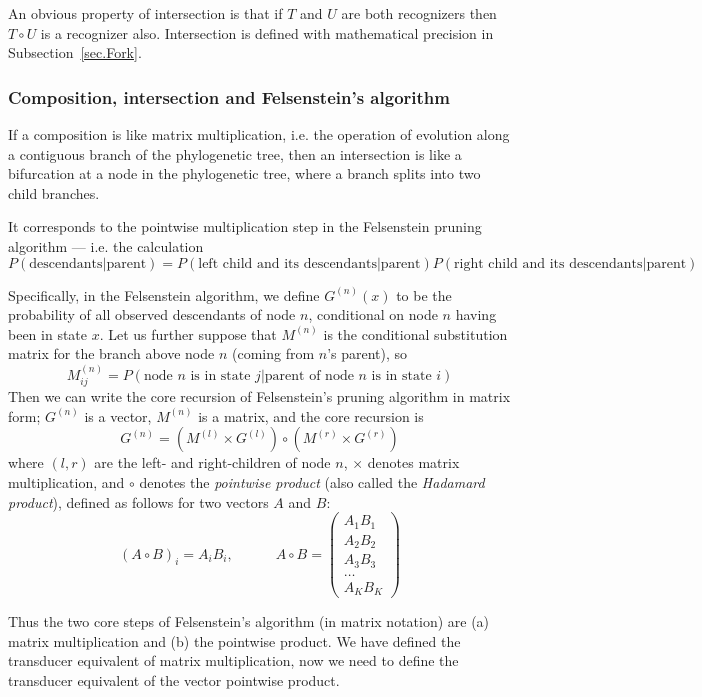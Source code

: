 \documentclass{article}
\newcommand{\secref}[1]{Subsection~\ref{sec.#1}}
\newcommand{\seclabel}[1]{\label{sec.#1}}
\newcommand\fork{\circ}
\begin{document}
An obvious property of intersection is that
if $T$ and $U$ are both recognizers then $T \fork U$ is a recognizer also.
Intersection is defined with mathematical precision in \secref{Fork}. 

\subsubsection{Composition, intersection and Felsenstein's algorithm}
\seclabel{Felsenstein}

If a composition is like matrix multiplication,
i.e. the operation of evolution along a contiguous branch of the phylogenetic tree,
then an intersection is like a bifurcation at a node in the phylogenetic tree,
where a branch splits into two child branches.

It corresponds to the pointwise multiplication step in the Felsenstein pruning algorithm ---
i.e. the calculation
\[
P(\mbox{descendants}|\mbox{parent}) =
P(\mbox{left child and its descendants}|\mbox{parent})
P(\mbox{right child and its descendants}|\mbox{parent})
\]

Specifically, in the Felsenstein algorithm,
we define $G^{(n)}(x)$ to be the probability of all observed descendants of node $n$,
conditional on node $n$ having been in state $x$.
Let us further suppose that $M^{(n)}$ is the conditional substitution matrix
for the branch above node $n$ (coming from $n$'s parent), so
\[
M^{(n)}_{ij}=P(\mbox{node $n$ is in state $j$}|\mbox{parent of node $n$ is in state $i$})
\]
Then we can write the core recursion of Felsenstein's pruning algorithm in matrix form;
$G^{(n)}$ is a vector, $M^{(n)}$ is a matrix, and the core recursion is
\[
G^{(n)} = \left( M^{(l)} \times G^{(l)} \right) \fork \left( M^{(r)} \times G^{(r)} \right)
\]
where $(l,r)$ are the left- and right-children of node $n$,
$\times$ denotes matrix multiplication,
and $\fork$ denotes the {\em pointwise product} (also called the {\em Hadamard product}),
defined as follows for two vectors $A$ and $B$:
\[
(A \fork B)_i = A_i B_i,
\quad \quad \quad
A \fork B = \left( \begin{array}{c}
A_1 B_1 \\ A_2 B_2 \\ A_3 B_3 \\ \ldots \\ A_K B_K
\end{array} \right)
\]

Thus the two core steps of Felsenstein's algorithm (in matrix notation)
are (a) matrix multiplication and (b) the pointwise product.
We have defined the transducer equivalent of matrix multiplication,
now we need to define the transducer equivalent of the vector pointwise product.
\end{document}
